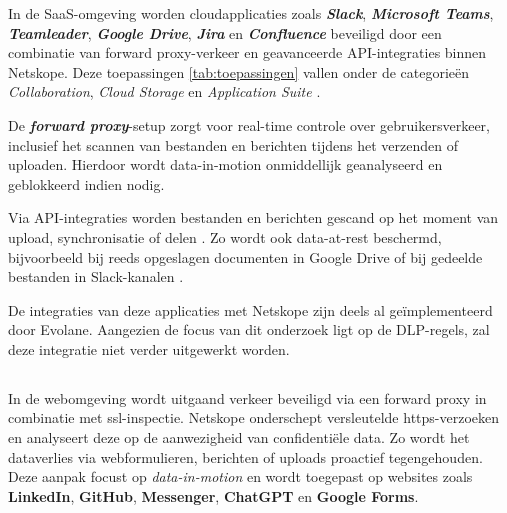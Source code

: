 
In de SaaS-omgeving worden cloudapplicaties zoals \textbf{\textit{Slack}}, \textbf{\textit{Microsoft Teams}}, \textbf{\textit{Teamleader}}, 
\textbf{\textit{Google Drive}}, \textbf{\textit{Jira}} en \textbf{\textit{Confluence}} beveiligd door een combinatie van forward proxy-verkeer en geavanceerde API-integraties binnen Netskope. 
Deze toepassingen \ref{tab:toepassingen} vallen onder de categorieën \textit{Collaboration}, \textit{Cloud Storage} en \textit{Application Suite} \autocite{Netskope2025API}.

De \textit{\textbf{forward proxy}}-setup zorgt voor real-time controle over gebruikersverkeer, 
inclusief het scannen van bestanden en berichten tijdens het verzenden of uploaden. 
Hierdoor wordt data-in-motion onmiddellijk geanalyseerd en geblokkeerd indien nodig.

Via API-integraties worden bestanden en berichten gescand op het moment van upload, synchronisatie of delen \autocite{Netskope2025API}. 
Zo wordt ook data-at-rest beschermd, bijvoorbeeld bij reeds opgeslagen documenten in Google Drive of bij gedeelde bestanden in Slack-kanalen \autocite{Netskope2022Slack}.

De integraties van deze applicaties met Netskope zijn deels al geïmplementeerd door Evolane. 
Aangezien de focus van dit onderzoek ligt op de DLP-regels, zal deze integratie niet verder uitgewerkt worden.

\subsection{}
\label{subsubsec:web-poc}

In de webomgeving wordt uitgaand verkeer beveiligd via een forward proxy in combinatie met \gls{ssl}-inspectie. 
Netskope onderschept versleutelde \gls{https}-verzoeken en analyseert deze op de aanwezigheid van confidentiële data.
Zo wordt het dataverlies via webformulieren, berichten of uploads proactief tegengehouden. 
Deze aanpak focust op \textit{data-in-motion} en wordt toegepast op websites zoals \textbf{LinkedIn}, \textbf{GitHub}, \textbf{Messenger}, \textbf{ChatGPT} en \textbf{Google Forms}.

